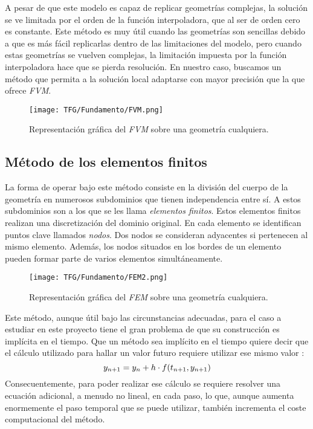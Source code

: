 \documentclass[11pt,a4paper,twoside,pdf]{article}
\numberwithin{equation}{section}
\begin{document}

\noindent

A pesar de que este modelo es capaz de replicar geometrías complejas, la solución se ve limitada por el orden de la función interpoladora, que al ser de orden cero es constante. Este método es muy útil cuando las geometrías son sencillas debido a que es más fácil replicarlas dentro de las limitaciones del modelo, pero cuando estas geometrías se vuelven complejas, la limitación impuesta por la función interpoladora hace que se pierda resolución. En nuestro caso, buscamos un método que permita a la solución local adaptarse con mayor precisión que la que ofrece \textit{FVM}.

\begin{figure}[H]
\centering
\texttt{[image: TFG/Fundamento/FVM.png]}				
\caption{Representación gráfica del \textit{FVM} sobre una geometría cualquiera.} \label{FVM}
\end{figure}
\subsection{Método de los elementos finitos}
La forma de operar bajo este método consiste en la división del cuerpo de la geometría en numerosos subdominios que tienen independencia entre sí. A estos subdominios son a los que se les llama \textit{elementos finitos}. Estos elementos finitos realizan una discretización del dominio original.  En cada elemento se identifican puntos clave llamados \textit{nodos}. Dos nodos se consideran adyacentes si pertenecen al mismo elemento. Además, los nodos situados en los bordes de un elemento pueden formar parte de varios elementos simultáneamente. 


\begin{figure}[h]
\centering
\texttt{[image: TFG/Fundamento/FEM2.png]}				
\caption{Representación gráfica del \textit{FEM} sobre una geometría cualquiera.}
\end{figure}
\noindent
Este método, aunque útil bajo las circunstancias adecuadas, para el caso a estudiar en este proyecto tiene el gran problema de que su construcción es implícita en el tiempo. Que un método sea implícito en el tiempo quiere decir que el cálculo utilizado para hallar un valor futuro requiere utilizar ese mismo valor \cite{explicitorimplicit}:
\begin{equation}
    y_{n+1}=y_n+h\cdot f(t_{n+1},y_{n+1}) \notag
\end{equation}
Consecuentemente, para poder realizar ese cálculo se requiere resolver una ecuación adicional, a menudo no lineal, en cada paso, lo que, aunque aumenta enormemente el paso temporal que se puede utilizar, también incrementa el coste computacional del método.
\end{document}
